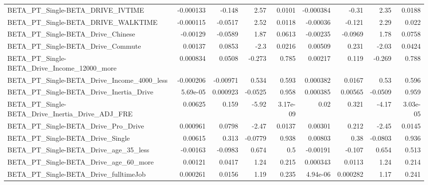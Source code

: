 \begin{tabular}{lrrrrrrrr}
BETA\_PT\_Single-BETA\_DRIVE\_IVTIME                   &   -0.000133 &       -0.148 &     2.57 &   0.0101 &  -0.000384 &       -0.31 &         2.35 &        0.0188 \\
BETA\_PT\_Single-BETA\_DRIVE\_WALKTIME                 &   -0.000115 &      -0.0517 &     2.52 &   0.0118 &   -0.00036 &      -0.121 &         2.29 &         0.022 \\
BETA\_PT\_Single-BETA\_Drive\_Chinese                  &    -0.00129 &      -0.0589 &     1.87 &   0.0613 &   -0.00235 &     -0.0969 &         1.78 &        0.0758 \\
BETA\_PT\_Single-BETA\_Drive\_Commute                  &     0.00137 &       0.0853 &     -2.3 &   0.0216 &    0.00509 &       0.231 &        -2.03 &        0.0424 \\
BETA\_PT\_Single-BETA\_Drive\_Income\_12000\_more        &    0.000834 &       0.0508 &   -0.273 &    0.785 &    0.00217 &       0.119 &       -0.269 &         0.788 \\
BETA\_PT\_Single-BETA\_Drive\_Income\_4000\_less         &   -0.000206 &     -0.00971 &    0.534 &    0.593 &   0.000382 &      0.0167 &         0.53 &         0.596 \\
BETA\_PT\_Single-BETA\_Drive\_Inertia\_Drive            &    5.69e-05 &     0.000923 &  -0.0525 &    0.958 &   0.000385 &     0.00565 &      -0.0509 &         0.959 \\
BETA\_PT\_Single-BETA\_Drive\_Inertia\_Drive\_ADJ\_FRE    &     0.00625 &        0.159 &    -5.92 & 3.17e-09 &       0.02 &       0.321 &        -4.17 &      3.03e-05 \\
BETA\_PT\_Single-BETA\_Drive\_Pro\_Drive                &    0.000961 &       0.0798 &    -2.47 &   0.0137 &    0.00301 &       0.212 &        -2.45 &        0.0145 \\
BETA\_PT\_Single-BETA\_Drive\_Single                   &     0.00615 &        0.313 &  -0.0779 &    0.938 &    0.00803 &        0.38 &      -0.0803 &         0.936 \\
BETA\_PT\_Single-BETA\_Drive\_age\_35\_less              &    -0.00163 &      -0.0983 &    0.674 &      0.5 &   -0.00191 &      -0.107 &        0.654 &         0.513 \\
BETA\_PT\_Single-BETA\_Drive\_age\_60\_more              &     0.00121 &       0.0417 &     1.24 &    0.215 &   0.000343 &      0.0113 &         1.24 &         0.214 \\
BETA\_PT\_Single-BETA\_Drive\_fulltimeJob              &    0.000261 &       0.0156 &     1.19 &    0.235 &   4.94e-06 &    0.000282 &         1.17 &         0.241 \\

\end{tabular}
